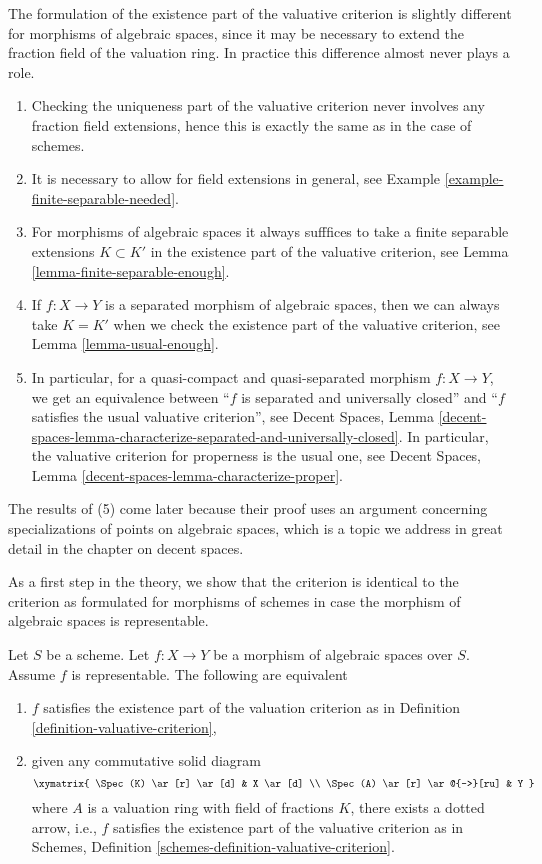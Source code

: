 \noindent
The formulation of the existence part of the valuative criterion is
slightly different for morphisms of algebraic spaces, since it may be
necessary to extend the fraction field of the valuation ring.
In practice this difference almost never plays a role.
\begin{enumerate}
\item Checking the uniqueness part of the valuative criterion never
involves any fraction field extensions, hence this is exactly the same
as in the case of schemes.
\item It is necessary to allow for field extensions in general, see
Example \ref{example-finite-separable-needed}.
\item For morphisms of algebraic spaces it always sufffices to
take a finite separable extensions $K \subset K'$ in the existence
part of the valuative criterion, see Lemma \ref{lemma-finite-separable-enough}.
\item If $f : X \to Y$ is a separated morphism of algebraic spaces, then
we can always take $K = K'$ when we check the existence part of the
valuative criterion, see Lemma \ref{lemma-usual-enough}.
\item In particular, for a quasi-compact and quasi-separated
morphism $f : X \to Y$, we get an equivalence between
``$f$ is separated and universally closed'' and ``$f$ satisfies
the usual valuative criterion'', see
Decent Spaces, Lemma
\ref{decent-spaces-lemma-characterize-separated-and-universally-closed}.
In particular, the valuative
criterion for properness is the usual one, see
Decent Spaces, Lemma \ref{decent-spaces-lemma-characterize-proper}.
\end{enumerate}
The results of (5) come later because their proof uses an argument concerning
specializations of points on algebraic spaces, which is a topic we address
in great detail in the chapter on decent spaces.

\medskip\noindent
As a first step in the theory, we show that the criterion is identical
to the criterion as formulated for morphisms of schemes
in case the morphism of algebraic spaces is representable.

\begin{lemma}
\label{lemma-valuative-criterion-representable}
Let $S$ be a scheme.
Let $f : X \to Y$ be a morphism of algebraic spaces over $S$.
Assume $f$ is representable. The following are equivalent
\begin{enumerate}
\item $f$ satisfies the existence part of the valuation criterion
as in Definition \ref{definition-valuative-criterion},
\item given any commutative solid diagram
$$
\xymatrix{
\Spec(K) \ar[r] \ar[d] & X \ar[d] \\
\Spec(A) \ar[r] \ar@{-->}[ru] & Y
}
$$
where $A$ is a valuation ring with field of fractions $K$, there exists
a dotted arrow, i.e., $f$ satisfies the existence part of the valuative
criterion as in
Schemes, Definition \ref{schemes-definition-valuative-criterion}.
\end{enumerate}
\end{lemma}

